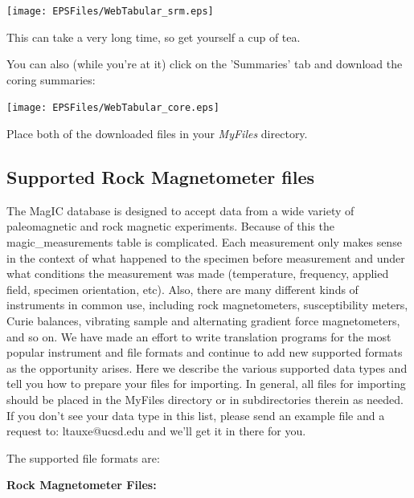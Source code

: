 \documentclass[11pt]{book}
\begin{document}
{\texttt{[image: EPSFiles/WebTabular\_srm.eps]}

This can take a very long time, so get yourself a cup of tea.

You can also (while you're at it) click on the 'Summaries' tab and download the coring summaries:

\texttt{[image: EPSFiles/WebTabular\_core.eps]}

Place both of the downloaded files in your {\it MyFiles} directory.



\subsection{Supported Rock Magnetometer files}

The MagIC database is designed to accept data from a wide variety of paleomagnetic and rock magnetic experiments. Because of this the magic\_measurements table is complicated. Each measurement only makes sense in the context of what happened to the specimen before measurement and under what conditions the measurement was made (temperature, frequency, applied field, specimen orientation, etc). Also, there are many different kinds of instruments in common use, including rock magnetometers, susceptibility meters, Curie balances, vibrating sample and alternating gradient force magnetometers, and so on. We have made an effort to write translation programs for the most popular instrument and file formats and continue to add new supported formats as the opportunity arises. Here we describe the various supported data types and tell you how to prepare your files for importing. In general, all files for importing should be placed in the MyFiles directory or in subdirectories therein as needed.  If you don't see your data type in this list, please send an example file and a request to:  ltauxe@ucsd.edu and we'll get it in there for you.


The supported file formats are:

{\bf Rock Magnetometer Files:}

}
\end{document}

